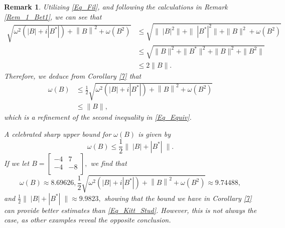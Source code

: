 \documentclass[12pt,twoside,reqno]{amsart}
\newtheorem{remark}{Remark}[section]
\numberwithin{equation}{section}
\begin{document}
\begin{remark}
Utilizing \eqref{Eq_Fil}, and following the calculations in Remark \ref{Rem_1_Bet1}, we can see that
\begin{align*}
\sqrt{{{\omega }^{2}}\left( \left| B \right|+i\left| {{B}^{*}} \right| \right)+{{\left\| B \right\|}^{2}}+\omega \left( {{B}^{2}} \right)}&\leq \sqrt{\|\;|B|^2\|+\|\;|B^*|^2\|+\|B\|^2+\omega(B^2)}\\
&\leq \sqrt{\|B\|^2+\|B^*\|^2+\|B\|^2+\|B^2\|}\\
&\leq 2\|B\|.
\end{align*}
Therefore, we deduce from Corollary \ref{7} that
\begin{align*}
\omega \left( B \right)&\le \frac{1}{2}\sqrt{{{\omega }^{2}}\left( \left| B \right|+i\left| {{B}^{*}} \right| \right)+{{\left\| B \right\|}^{2}}+\omega \left( {{B}^{2}} \right)}\\
&\leq\|B\|,
\end{align*}
which is a refinement of the second inequality in \eqref{Eq_Equiv}.

A celebrated sharp upper bound for $\omega(B)$ is given by \cite{Kittaneh_Studia_2003}
\begin{equation}\label{Eq_Kitt_Stud}
\omega(B)\leq\frac{1}{2}\|\;|B|+|B^*|\;\|.
\end{equation}
If we let $B=\left[
\begin{array}{cc}
 -4 & 7 \\
 -4 & -8 \\
\end{array}
\right],$ we find that
\[\omega(B)\approx 8.69626, \frac{1}{2}\sqrt{{{\omega }^{2}}\left( \left| B \right|+i\left| {{B}^{*}} \right| \right)+{{\left\| B \right\|}^{2}}+\omega \left( {{B}^{2}} \right)}\approx 9.74488,\]
and $\frac{1}{2}\|\;|B|+|B^*|\;\|\approx 9.9823,$ showing that the bound we have in Corollary \ref{7} can provide better estimates than \eqref{Eq_Kitt_Stud}. However, this is not always the case, as other examples reveal the opposite conclusion.
\end{remark}
\end{document}
